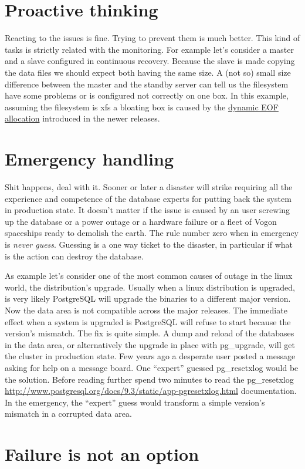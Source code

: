\section{Proactive thinking}
Reacting to the issues is fine. Trying to prevent them is much better. This kind of tasks is strictly 
related with the monitoring. For example let's consider a master and a slave configured in continuous 
recovery. Because the slave is made copying the data files we should expect both having the same size. 
A (not so) small size difference between the master and the standby server can tell us the filesystem have 
some problems or is configured not correctly on one box. In this example, assuming the filesystem is xfs a 
bloating box is caused by the 
\href{
http://serverfault.com/questions/406069/why-are-my-xfs-filesystems-suddenly-consuming-more-space-and-full-of
-sparse-file}{dynamic EOF allocation} introduced in the newer releases.

\section{Emergency handling}
Shit happens, deal with it. Sooner or later a disaster will strike requiring all the experience and 
competence of the database experts for putting back the system in production state. It doesn't matter if the 
issue is caused by an user screwing up the database or a power outage or a hardware failure or a fleet of 
Vogon spaceships ready to demolish the earth. The rule number zero when in emergency is \textit{never 
guess}. Guessing is a one way ticket to the disaster, in particular if what is the action 
can destroy the database.\newline

As example let's consider one of the most common causes of outage in the linux world, the distribution's 
upgrade. Usually when a linux distribution is upgraded, is very likely PostgreSQL will upgrade the 
binaries to a different major version. Now the data area is not compatible across the major releases. The 
immediate effect when a system is upgraded is PostgreSQL will refuse to start because the version's 
mismatch. The fix is quite simple. A dump and reload of the databases in the data area, or alternatively 
the upgrade in place with pg\_upgrade, will get the cluster in production state. Few years ago a 
desperate user posted a message asking for help on a message board. One ``expert'' guessed 
pg\_resetxlog would be the solution. Before reading further spend two minutes to  read the 
pg\_resetxlog 
\href{http://www.postgresql.org/docs/9.3/static/app-pgresetxlog.html}{
http://www.postgresql.org/docs/9.3/static/app-pgresetxlog.html} documentation. In the emergency, the 
``expert'' guess would transform a simple version's mismatch in a corrupted data area.


\section{Failure is not an option}